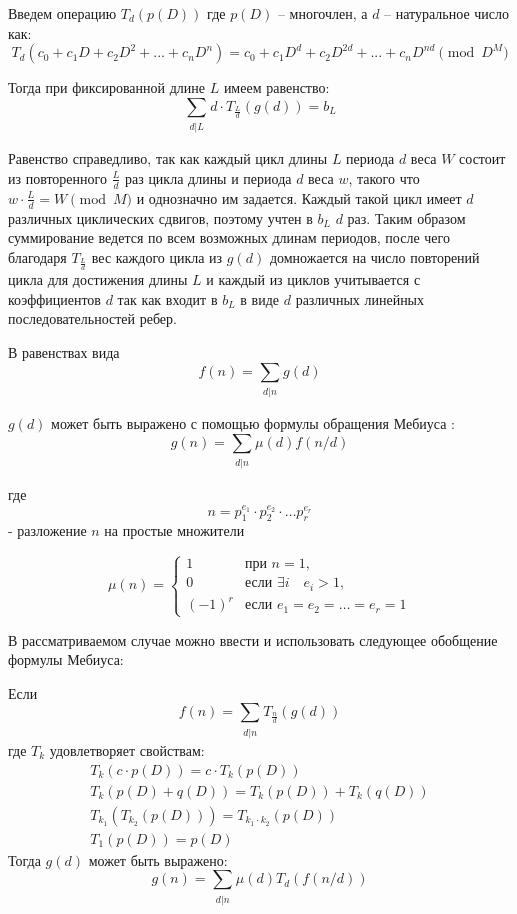 \begin{definition} \label{def1}
Введем операцию $T_d(p(D))$ где $p(D)$ -- многочлен, а $d$ -- натуральное число как:
\[
  T_d(c_0+c_1D+c_2D^2+...+c_nD^n) = c_0+c_1D^{d}+c_2D^{2d}+...+c_nD^{nd} \pmod{D^M}
\]
\end{definition}

Тогда при фиксированной длине $L$ имеем равенство:
\[
  \sum_{\substack{d | L}}d \cdot T_{\frac{L}{d}}(g(d)) = b_L \label{eqWithT}
\]

Равенство справедливо, так как каждый цикл длины $L$ периода $d$ веса $W$ состоит из повторенного $\frac{L}{d}$ раз
цикла длины и периода $d$ веса $w$, такого что $w\cdot \frac{L}{d} = W \pmod M$ и однозначно им задается.
Каждый такой цикл имеет $d$ различных циклических сдвигов, поэтому учтен в $b_L$ $d$ раз.
Таким образом суммирование ведется по всем возможных длинам периодов, после чего благодаря $T_{\frac{L}{d}}$
вес каждого цикла из $g(d)$ домножается на число повторений цикла для достижения длины $L$ и каждый
из циклов учитывается с коэффициентов $d$ так как входит в $b_L$ в виде $d$ различных линейных 
последовательностей ребер.

В равенствах вида
\[
  f(n)=\sum_{\substack{d|n}}g(d)
\]

$g(d)$ может быть выражено с помощью формулы обращения Мебиуса \cite{hall-combinatorics}:
\[
  g(n) = \sum_{\substack{d|n}}\mu(d)f(n/d)
\]

где\[
  n = p_1^{e_1} \cdot p_2^{e_2} \cdot \ldots p_r^{e_r}
\]
- разложение $n$ на простые множители

\[
  \mu(n)=
\left\{
  \begin{array}{lll}
    1 & \mbox{при } n=1, \\
    0 & \mbox{если } \exists i \quad e_i > 1, \\
    (-1)^r & \mbox{если } e_1 = e_2 = \ldots = e_r = 1
  \end{array}
\right.
\]

В рассматриваемом случае можно ввести и использовать следующее обобщение формулы Мебиуса:

\begin{theorem} \label{th1}
Если
\[
  f(n) = \sum_{\substack{d|n}}T_{\frac{n}{d}}(g(d))
\]
где $T_{k}$ удовлетворяет свойствам:
\begin{eqnarray}
T_k(c \cdot p(D)) = c \cdot T_k(p(D)) \label{eq1}\\
T_k(p(D)+q(D)) = T_k(p(D))+T_k(q(D))\label{eq2}\\
T_{k_1}(T_{k_2}(p(D))) = T_{k_1\cdot k_2}(p(D)) \label{eq3}\\
T_1(p(D)) = p(D) \label{eq4}\
\end{eqnarray}
Тогда $g(d)$ может быть выражено:
\[
  g(n) = \sum_{\substack{d|n}}\mu(d)T_d(f(n/d))
\]
\end{theorem}

